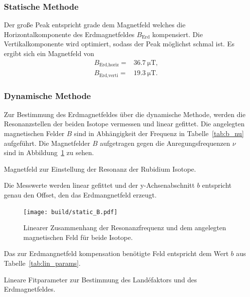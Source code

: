 \subsubsection{Statische Methode}%
\label{ssub:subsubsection_name}
Der große Peak entspricht grade dem Magnetfeld welches die Horizontalkomponente
des Erdmagnetfeldes $B_\text{Erd}$ kompensiert.
Die Vertikalkomponente wird optimiert, sodass der Peak möglichst schmal ist. 
Es ergibt sich ein Magnetfeld von 
\begin{eqnarray}
	B_\text{Erd,horiz} =& \SI{36.7}{\micro\tesla}, \\
	B_\text{Erd,verti} =& \SI{19.3}{\micro\tesla}. 
\end{eqnarray}

\subsubsection{Dynamische Methode}%
\label{ssub:dynamische_methode}
Zur Bestimmung des Erdmagnetfeldes über die dynamische Methode, werden die
Resonanzstellen der beiden Isotope vermessen und linear gefittet.
Die angelegten magnetischen Felder $B$ sind in Abhängigkeit der Frequenz in
Tabelle~\ref{tab:b_nu} aufgeführt.
Die Magnetfelder $B$ aufgetragen gegen die Anregungsfrequenzen $\nu$ sind in
Abbildung~\ref{fig:static_B} zu sehen.
\begin{table}[h]
	\centering
	\caption{Magnetfeld zur Einstellung der Resonanz der Rubidium Isotope.}
	\label{tab:b_nu}
		
\end{table}
Die Messwerte werden linear gefittet und der y-Achsenabschnitt $b$ 
entspricht genau den Offset, den das Erdmangnetfeld erzeugt.
\begin{figure}[h]
	\centering
	\texttt{[image: build/static\_B.pdf]}
	\caption{Linearer Zusammenhang der Resonanzfrequenz und dem angelegten
	magnetischen Feld für beide Isotope.}
	\label{fig:static_B}
\end{figure}
Das zur Erdmangnetfeld kompensation benötigte Feld entspricht dem Wert $b$ aus
Tabelle~\ref{tab:lin_params}.
\begin{table}[h]
	\centering
	\caption{Lineare Fitparameter zur Bestimmung des Land\'efaktors und des
	Erdmagnetfeldes.}
	\label{tab:lin_params}
	
\end{table}
